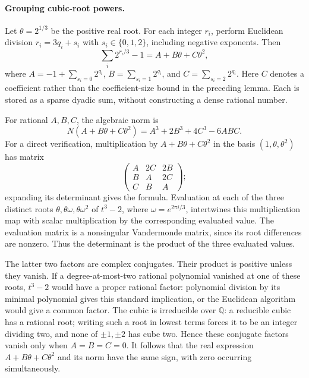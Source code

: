 \documentclass[11pt]{article}
\begin{document}
\paragraph{Grouping cubic-root powers.}
Let $\theta=2^{1/3}$ be the positive real root. For each integer $r_i$, perform Euclidean division $r_i=3q_i+s_i$ with $s_i\in\{0,1,2\}$, including negative exponents. Then
\[
\sum_i2^{r_i/3}-1=A+B\theta+C\theta^2,
\]
where $A=-1+\sum_{s_i=0}2^{q_i}$, $B=\sum_{s_i=1}2^{q_i}$, and $C=\sum_{s_i=2}2^{q_i}$. Here $C$ denotes a coefficient rather than the coefficient-size bound in the preceding lemma. Each is stored as a sparse dyadic sum, without constructing a dense rational number.

For rational $A,B,C$, the algebraic norm is
\[
N(A+B\theta+C\theta^2)=A^3+2B^3+4C^3-6ABC.
\]
For a direct verification, multiplication by $A+B\theta+C\theta^2$ in the basis $(1,\theta,\theta^2)$ has matrix
\[
\begin{pmatrix}A&2C&2B\\B&A&2C\\C&B&A\end{pmatrix};
\]
expanding its determinant gives the formula. Evaluation at each of the three distinct roots $\theta,\theta\omega,\theta\omega^2$ of $t^3-2$, where $\omega=e^{2\pi i/3}$, intertwines this multiplication map with scalar multiplication by the corresponding evaluated value. The evaluation matrix is a nonsingular Vandermonde matrix, since its root differences are nonzero. Thus the determinant is the product of the three evaluated values.

The latter two factors are complex conjugates. Their product is positive unless they vanish. If a degree-at-most-two rational polynomial vanished at one of these roots, $t^3-2$ would have a proper rational factor: polynomial division by its minimal polynomial gives this standard implication, or the Euclidean algorithm would give a common factor. The cubic is irreducible over $\mathbb Q$: a reducible cubic has a rational root; writing such a root in lowest terms forces it to be an integer dividing two, and none of $\pm1,\pm2$ has cube two. Hence these conjugate factors vanish only when $A=B=C=0$. It follows that the real expression $A+B\theta+C\theta^2$ and its norm have the same sign, with zero occurring simultaneously.
\end{document}
